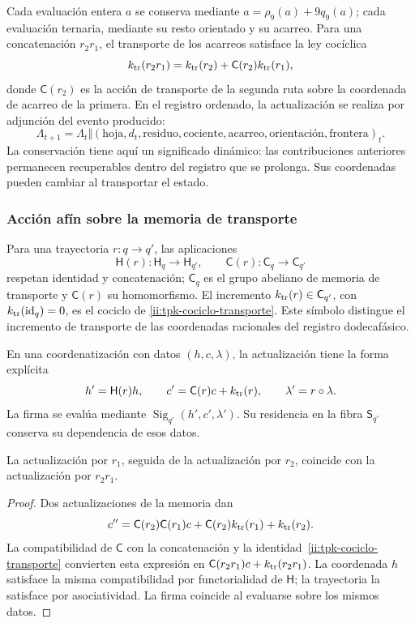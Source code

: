 Cada evaluación entera \(a\) se conserva mediante
\(a=\rho_9(a)+9q_9(a)\); cada evaluación ternaria, mediante su resto
orientado y su acarreo. Para una concatenación \(r_2r_1\), el transporte
de los acarreos satisface la ley cocíclica
\begin{equation}
 k_{\rm tr}(r_2r_1)
 =k_{\rm tr}(r_2)+\mathsf C(r_2)k_{\rm tr}(r_1),
 \label{ii:tpk-cociclo-transporte}
\end{equation}
donde \(\mathsf C(r_2)\) es la acción de transporte de la segunda ruta
sobre la coordenada de acarreo de la primera. En el registro ordenado,
la actualización se realiza por adjunción del evento producido:
\[
 \Lambda_{t+1}=\Lambda_t\Vert
 (\text{hoja},d_t,\text{residuo},\text{cociente},
   \text{acarreo},\text{orientación},\text{frontera})_t.
\]
La conservación tiene aquí un significado dinámico: las contribuciones
anteriores permanecen recuperables dentro del registro que se prolonga.
Sus coordenadas pueden cambiar al transportar el estado.

\subsubsection{Acción afín sobre la memoria de transporte}

Para una trayectoria \(r:q\to q'\), las aplicaciones
\[
 \mathsf H(r):\mathsf H_q\to\mathsf H_{q'},\qquad
 \mathsf C(r):\mathsf C_q\to\mathsf C_{q'}
\]
respetan identidad y concatenación; \(\mathsf C_q\) es el grupo
abeliano de memoria de transporte y \(\mathsf C(r)\) su homomorfismo.
El incremento \(k_{\rm tr}(r)\in\mathsf C_{q'}\), con
\(k_{\rm tr}(\operatorname{id}_q)=0\), es el cociclo de
\eqref{ii:tpk-cociclo-transporte}. Este símbolo distingue el incremento
de transporte de las coordenadas racionales del registro dodecafásico.

En una coordenatización con datos \((h,c,\lambda)\), la actualización tiene la
forma explícita
\begin{equation}
 h'=\mathsf H(r)h,\qquad
 c'=\mathsf C(r)c+k_{\rm tr}(r),\qquad
 \lambda'=r\circ\lambda.
 \label{ii:tpk-accion-afin}
\end{equation}
La firma se evalúa mediante
\(\operatorname{Sig}_{q'}(h',c',\lambda')\). Su residencia en la
fibra \(\mathsf S_{q'}\) conserva su dependencia de esos datos.

\begin{proposition}
\label{ii:tpk-composicion-afin}
La actualización por \(r_1\), seguida de la actualización por
\(r_2\), coincide con la actualización por \(r_2r_1\).
\end{proposition}
\begin{proof}
Dos actualizaciones de la memoria dan
\[
 c''=\mathsf C(r_2)\mathsf C(r_1)c
       +\mathsf C(r_2)k_{\rm tr}(r_1)+k_{\rm tr}(r_2).
\]
La compatibilidad de \(\mathsf C\) con la concatenación y la
identidad~\eqref{ii:tpk-cociclo-transporte} convierten esta expresión
en \(\mathsf C(r_2r_1)c+k_{\rm tr}(r_2r_1)\).
La coordenada \(h\) satisface la misma compatibilidad por
functorialidad de \(\mathsf H\); la trayectoria la satisface por
asociatividad. La firma coincide al evaluarse sobre los mismos datos.
\end{proof}


